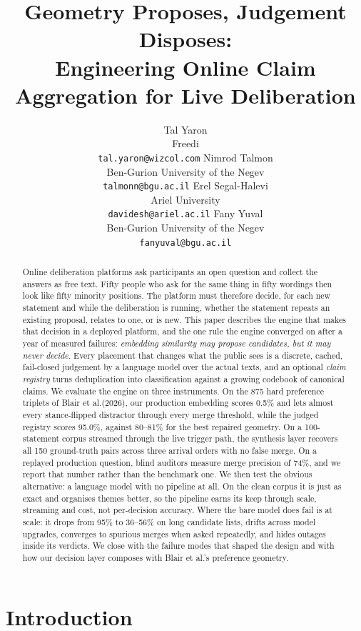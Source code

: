 \documentclass{article}
\title{Geometry Proposes, Judgement Disposes:\\Engineering Online Claim Aggregation for Live Deliberation}
\author{Tal Yaron \\
Freedi \\
\texttt{tal.yaron@wizcol.com}
\And
Nimrod Talmon \\
Ben-Gurion University of the Negev \\
\texttt{talmonn@bgu.ac.il}
\AND
Erel Segal-Halevi \\
Ariel University \\
\texttt{davidesh@ariel.ac.il}
\And
Fany Yuval \\
Ben-Gurion University of the Negev \\
\texttt{fanyuval@bgu.ac.il}
}
\newcommand{\bpt}{Blair et al.\xspace}
\begin{document}
\maketitle

\begin{abstract}
Online deliberation platforms ask participants an open question and collect the answers as free text. Fifty people who ask for the same thing in fifty wordings then look like fifty minority positions. The platform must therefore decide, for each new statement and while the deliberation is running, whether the statement repeats an existing proposal, relates to one, or is new. This paper describes the engine that makes that decision in a deployed platform, and the one rule the engine converged on after a year of measured failures: \emph{embedding similarity may propose candidates, but it may never decide}. Every placement that changes what the public sees is a discrete, cached, fail-closed judgement by a language model over the actual texts, and an optional \emph{claim registry} turns deduplication into classification against a growing codebook of canonical claims. We evaluate the engine on three instruments. On the 875 hard preference triplets of \bpt (2026), our production embedding scores 0.5\% and lets almost every stance-flipped distractor through every merge threshold, while the judged registry scores 95.0\%, against 80--81\% for the best repaired geometry. On a 100-statement corpus streamed through the live trigger path, the synthesis layer recovers all 150 ground-truth pairs across three arrival orders with no false merge. On a replayed production question, blind auditors measure merge precision of 74\%, and we report that number rather than the benchmark one. We then test the obvious alternative: a language model with no pipeline at all. On the clean corpus it is just as exact and organises themes better, so the pipeline earns its keep through scale, streaming and cost, not per-decision accuracy. Where the bare model does fail is at scale: it drops from 95\% to 36--56\% on long candidate lists, drifts across model upgrades, converges to spurious merges when asked repeatedly, and hides outages inside its verdicts. We close with the failure modes that shaped the design and with how our decision layer composes with \bpt's preference geometry.
\end{abstract}

\section{Introduction}
\end{document}
